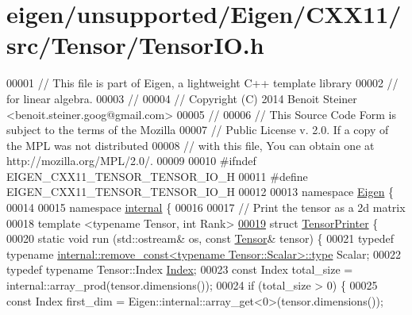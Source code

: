 \hypertarget{eigen_2unsupported_2_eigen_2_c_x_x11_2src_2_tensor_2_tensor_i_o_8h_source}{}\section{eigen/unsupported/\+Eigen/\+C\+X\+X11/src/\+Tensor/\+Tensor\+IO.h}
\label{eigen_2unsupported_2_eigen_2_c_x_x11_2src_2_tensor_2_tensor_i_o_8h_source}

\begin{DoxyCode}
00001 \textcolor{comment}{// This file is part of Eigen, a lightweight C++ template library}
00002 \textcolor{comment}{// for linear algebra.}
00003 \textcolor{comment}{//}
00004 \textcolor{comment}{// Copyright (C) 2014 Benoit Steiner <benoit.steiner.goog@gmail.com>}
00005 \textcolor{comment}{//}
00006 \textcolor{comment}{// This Source Code Form is subject to the terms of the Mozilla}
00007 \textcolor{comment}{// Public License v. 2.0. If a copy of the MPL was not distributed}
00008 \textcolor{comment}{// with this file, You can obtain one at http://mozilla.org/MPL/2.0/.}
00009 
00010 \textcolor{preprocessor}{#ifndef EIGEN\_CXX11\_TENSOR\_TENSOR\_IO\_H}
00011 \textcolor{preprocessor}{#define EIGEN\_CXX11\_TENSOR\_TENSOR\_IO\_H}
00012 
00013 \textcolor{keyword}{namespace }\hyperlink{namespace_eigen}{Eigen} \{
00014 
00015 \textcolor{keyword}{namespace }\hyperlink{namespaceinternal}{internal} \{
00016 
00017 \textcolor{comment}{// Print the tensor as a 2d matrix}
00018 \textcolor{keyword}{template} <\textcolor{keyword}{typename} Tensor, \textcolor{keywordtype}{int} Rank>
\hyperlink{struct_eigen_1_1internal_1_1_tensor_printer}{00019} \textcolor{keyword}{struct }\hyperlink{struct_eigen_1_1internal_1_1_tensor_printer}{TensorPrinter} \{
00020   \textcolor{keyword}{static} \textcolor{keywordtype}{void} run (std::ostream& os, \textcolor{keyword}{const} \hyperlink{class_eigen_1_1_tensor}{Tensor}& tensor) \{
00021     \textcolor{keyword}{typedef} \textcolor{keyword}{typename} \hyperlink{group___sparse_core___module}{internal::remove\_const<typename Tensor::Scalar>::type}
       Scalar;
00022     \textcolor{keyword}{typedef} \textcolor{keyword}{typename} Tensor::Index \hyperlink{namespace_eigen_a62e77e0933482dafde8fe197d9a2cfde}{Index};
00023     \textcolor{keyword}{const} Index total\_size = internal::array\_prod(tensor.dimensions());
00024     \textcolor{keywordflow}{if} (total\_size > 0) \{
00025       \textcolor{keyword}{const} Index first\_dim = Eigen::internal::array\_get<0>(tensor.dimensions());

\end{DoxyCode}
